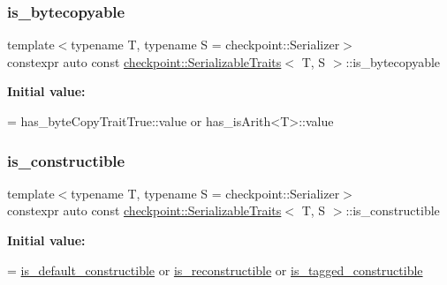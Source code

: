 \mbox{\label{structcheckpoint_1_1_serializable_traits_a19e58ea0f510be10502e476258ed14ae}} 
\subsubsection{\texorpdfstring{is\+\_\+bytecopyable}{is\_bytecopyable}}
{\footnotesize\ttfamily template$<$typename T, typename S = checkpoint\+::\+Serializer$>$ \\
constexpr auto const \hyperlink{structcheckpoint_1_1_serializable_traits}{checkpoint\+::\+Serializable\+Traits}$<$ T, S $>$\+::is\+\_\+bytecopyable\hspace{0.3cm}{\ttfamily [static]}}

{\bfseries Initial value\+:}
\begin{DoxyCode}
=
    has\_byteCopyTraitTrue::value or has\_isArith<T>::value
\end{DoxyCode}
\mbox{\label{structcheckpoint_1_1_serializable_traits_a7720e2f57d1b3d2f87fd022b47d0b775}} 
\subsubsection{\texorpdfstring{is\+\_\+constructible}{is\_constructible}}
{\footnotesize\ttfamily template$<$typename T, typename S = checkpoint\+::\+Serializer$>$ \\
constexpr auto const \hyperlink{structcheckpoint_1_1_serializable_traits}{checkpoint\+::\+Serializable\+Traits}$<$ T, S $>$\+::is\+\_\+constructible\hspace{0.3cm}{\ttfamily [static]}}

{\bfseries Initial value\+:}
\begin{DoxyCode}
=
    \hyperlink{structcheckpoint_1_1_serializable_traits_a4bdbe26cdd11c7ff07f84e4cfdf34e7f}{is\_default\_constructible} or \hyperlink{structcheckpoint_1_1_serializable_traits_a6cc78a7cc9b4645727c92437619fce83}{is\_reconstructible} or 
      \hyperlink{structcheckpoint_1_1_serializable_traits_aa6618d9f36e37127006112c73755fceb}{is\_tagged\_constructible}
\end{DoxyCode}
\mbox{\label{structcheckpoint_1_1_serializable_traits_a4bdbe26cdd11c7ff07f84e4cfdf34e7f}} 
